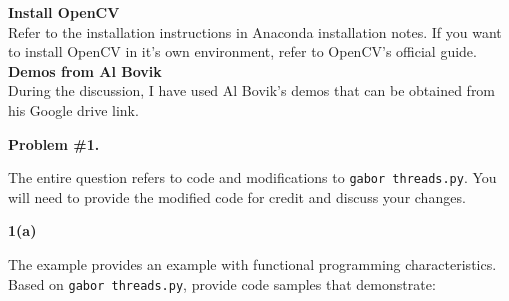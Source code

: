 \documentclass[11pt]{article}
\begin{document}
	\textbf{Install OpenCV}\\
	Refer to the installation instructions in Anaconda installation notes. If you want to install OpenCV in it's own environment, refer to OpenCV's official guide.\\
	
	\textbf{Demos from Al Bovik}\\
	During the discussion, I have used Al Bovik's demos that can be obtained from his Google drive link.
	
	\newpage
	
	\textbf{Problem \#1.}
	
	The entire question refers to code and modifications to \texttt{gabor threads.py}. You will need to provide the modified code for credit and discuss your changes.
	
	\textbf{1(a)}
	
	The example provides an example with functional programming characteristics. Based on \texttt{gabor threads.py}, provide code samples that demonstrate:
	
\end{document}
